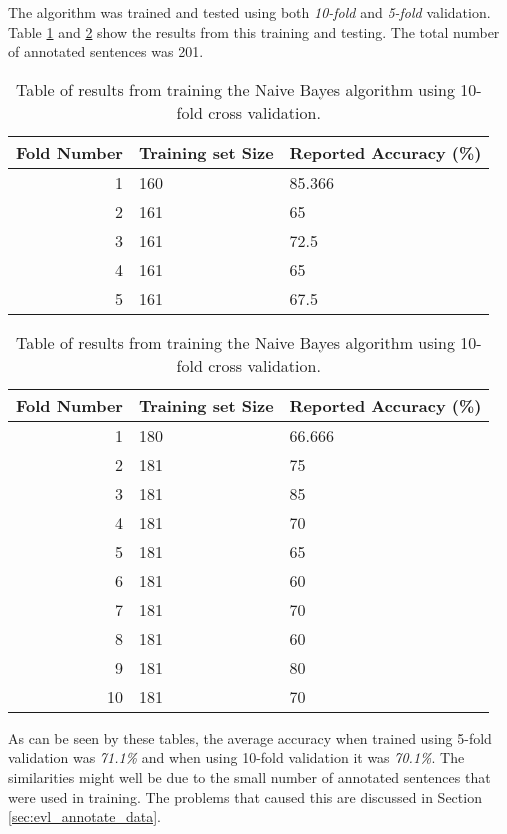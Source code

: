 The algorithm was trained and tested using both \emph{10-fold} and \emph{5-fold} validation. Table \ref{tbl:naive_bayes_results_5} and \ref{tbl:naive_bayes_results_10} show the results from this training and testing. The total number of annotated sentences was 201.
\begin{table}[ht]
\centering
\begin{tabular}{r | l | l}
\textbf{Fold Number} & \textbf{Training set Size} & \textbf{Reported Accuracy (\%)} \\
\hline
1  & 160 & 85.366 \\
2  & 161 & 65 \\
3  & 161 & 72.5 \\
4  & 161 & 65 \\
5  & 161 & 67.5 \\

\end{tabular}
\caption{Table of results from training the Naive Bayes algorithm using 10-fold cross validation.}
\label{tbl:naive_bayes_results_5}
\end{table} 

\begin{table}[ht]
\centering
\begin{tabular}{r | l | l}
\textbf{Fold Number} & \textbf{Training set Size} & \textbf{Reported Accuracy (\%)} \\
\hline
1  & 180 & 66.666 \\
2  & 181 & 75 \\
3  & 181 & 85 \\
4  & 181 & 70 \\
5  & 181 & 65 \\
6  & 181 & 60 \\
7  & 181 & 70 \\
8  & 181 & 60 \\
9  & 181 & 80 \\
10 & 181 & 70 \\

\end{tabular}
\caption{Table of results from training the Naive Bayes algorithm using 10-fold cross validation.}
\label{tbl:naive_bayes_results_10}
\end{table} 

As can be seen by these tables, the average accuracy when trained using 5-fold validation was \emph{71.1\%} and when using 10-fold validation it was \emph{70.1\%}. The similarities might well be due to the small number of annotated sentences that were used in training. The problems that caused this are discussed in Section \ref{sec:evl_annotate_data}.

